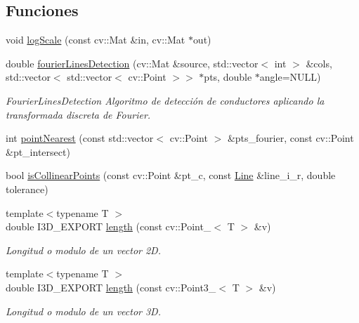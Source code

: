 \subsection*{Funciones}
\begin{DoxyCompactItemize}
\item 
void \hyperlink{namespace_i3_d_a61642b345ce36927fc6694a81d6540f7}{log\+Scale} (const cv\+::\+Mat \&in, cv\+::\+Mat $\ast$out)
\item 
double \hyperlink{namespace_i3_d_a83df44c7261ddd174a2bcdaaa6935552}{fourier\+Lines\+Detection} (cv\+::\+Mat \&source, std\+::vector$<$ int $>$ \&cols, std\+::vector$<$ std\+::vector$<$ cv\+::\+Point $>$$>$ $\ast$pts, double $\ast$angle=N\+U\+LL)
\begin{DoxyCompactList}\small\item\em Fourier\+Lines\+Detection Algoritmo de detección de conductores aplicando la transformada discreta de Fourier. \end{DoxyCompactList}\item 
int \hyperlink{group___geometric_entities_ga50289ee8c51aeff4b2f4706acbabd932}{point\+Nearest} (const std\+::vector$<$ cv\+::\+Point $>$ \&pts\+\_\+fourier, const cv\+::\+Point \&pt\+\_\+intersect)
\item 
bool \hyperlink{group___geometric_entities_gaa7aa32d175a13ad9ac23bfe016754b1f}{is\+Collinear\+Points} (const cv\+::\+Point \&pt\+\_\+c, const \hyperlink{group___geometric_entities_ga483b43891a1b33d99406fdc397e9a445}{Line} \&line\+\_\+i\+\_\+r, double tolerance)
\item 
{\footnotesize template$<$typename T $>$ }\\double I3\+D\+\_\+\+E\+X\+P\+O\+RT \hyperlink{group___geometric_entities_ga6cfd96fd34bd41f5b201d69d70daa705}{length} (const cv\+::\+Point\+\_\+$<$ T $>$ \&v)
\begin{DoxyCompactList}\small\item\em Longitud o modulo de un vector 2D. \end{DoxyCompactList}\item 
{\footnotesize template$<$typename T $>$ }\\double I3\+D\+\_\+\+E\+X\+P\+O\+RT \hyperlink{group___geometric_entities_gadc4e42bc957a28f97e0d45d09d5e1db7}{length} (const cv\+::\+Point3\+\_\+$<$ T $>$ \&v)
\begin{DoxyCompactList}\small\item\em Longitud o modulo de un vector 3D. \end{DoxyCompactList}\item 
$$
\end{DoxyCompactItemize}
